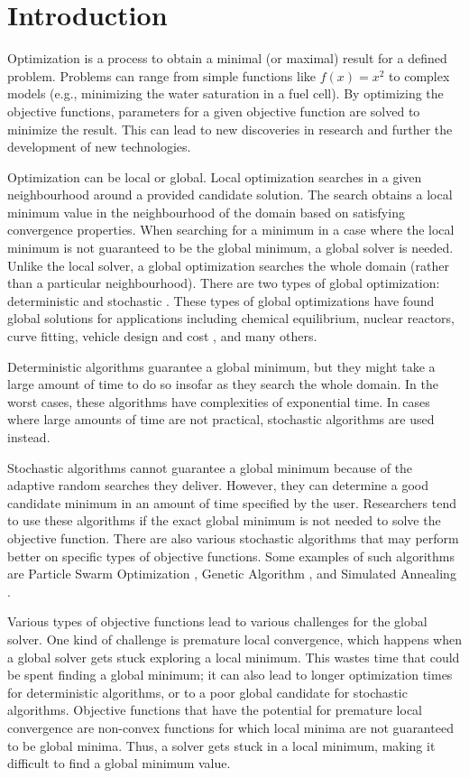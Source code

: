 
\chapter{Introduction}
\label{introduction}

Optimization is a process to obtain a minimal (or maximal) result for a defined problem. Problems can range from simple functions like $f(x) = x^2$ to complex models (e.g., minimizing the water saturation in a fuel cell). By optimizing the objective functions, parameters for a given objective function are solved to minimize the result. This can lead to new discoveries in research and further the development of new technologies.

Optimization can be local or global. Local optimization searches in a given neighbourhood around a provided candidate solution. The search obtains a local minimum value in the neighbourhood of the domain based on satisfying convergence properties. When searching for a minimum in a case where the local minimum is not guaranteed to be the global minimum, a global solver is needed. Unlike the local solver, a global optimization searches the whole domain (rather than a particular neighbourhood). There are two types of global optimization: deterministic and stochastic \cite{Liberti2000}. These types of global optimizations have found global solutions for  applications including chemical equilibrium, nuclear reactors, curve fitting, vehicle design and cost \cite{Pinter2002}, and many others.

Deterministic algorithms guarantee a global minimum, but they might take a large amount of time to do so insofar as they search the whole domain. In the worst cases, these algorithms have complexities of exponential time. In cases where large amounts of time are not practical, stochastic algorithms are used instead. 

Stochastic algorithms cannot guarantee a global minimum because of the adaptive random searches they deliver. However, they can determine a good candidate minimum in an amount of time specified by the user. Researchers tend to use these algorithms if the exact global minimum is not needed to solve the objective function. There are also various stochastic algorithms that may perform better on specific types of objective functions. Some examples of such algorithms are Particle Swarm Optimization
\cite{Kennedy1995}, Genetic Algorithm \cite{Aguiar}, and Simulated Annealing \cite{Aguiar}. 

Various types of objective functions lead to various challenges for the global solver. One kind of challenge is premature local convergence, which happens when a global solver gets stuck exploring a local minimum. This wastes time that could be spent finding a global minimum; it can also lead to longer optimization times for deterministic algorithms, or to a poor global candidate for stochastic algorithms. Objective functions that have the potential for premature local convergence are non-convex
functions for which local minima are not guaranteed to be global minima. Thus, a solver gets stuck in a local minimum, making it difficult to find a global minimum value. 

